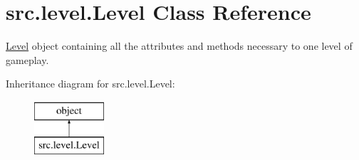 \hypertarget{classsrc_1_1level_1_1_level}{}\section{src.\+level.\+Level Class Reference}
\label{classsrc_1_1level_1_1_level}


\hyperlink{classsrc_1_1level_1_1_level}{Level} object containing all the attributes and methods necessary to one level of gameplay.  


Inheritance diagram for src.\+level.\+Level\+:\begin{figure}[H]
\begin{center}
\leavevmode
\includegraphics[height=2.000000cm]{classsrc_1_1level_1_1_level}
\end{center}
\end{figure}
